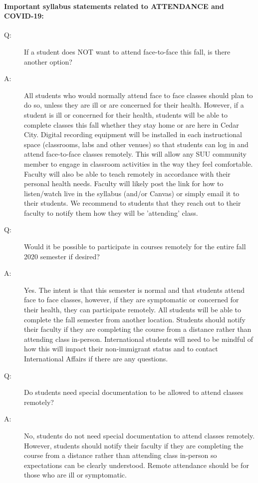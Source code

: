 \documentclass[12pt, letterpaper]{article}
\begin{document}
\paragraph{Important syllabus statements related to ATTENDANCE and COVID-19:}
\begin{description}
	\item[Q:~~~~~~] If a student does NOT want to attend face-to-face this fall, is there another option?
	\item[A:~~~~~~] All students who would normally attend face to face classes should plan to do so, unless they are ill or are concerned for their health. However, if a student is ill or concerned for their health, students will be able to complete classes this fall whether they stay home or are here in Cedar City. Digital recording equipment will be installed in each instructional space (classrooms, labs and other venues) so that students can log in and attend face-to-face classes remotely. This will allow any SUU community member to engage in classroom activities in the way they feel comfortable. Faculty will also be able to teach remotely in accordance with their personal health needs. Faculty will likely post the link for how to listen/watch live in the syllabus (and/or Canvas) or simply email it to their students. We recommend to students that they reach out to their faculty to notify them how they will be 'attending' class.
	\item[Q:~~~~~~] Would it be possible to participate in courses remotely for the entire fall 2020 semester if desired?
	\item[A:~~~~~~] Yes. The intent is that this semester is normal and that students attend face to face classes, however, if they are symptomatic or concerned for their health, they can participate remotely. All students will be able to complete the fall semester from another location. Students should notify their faculty if they are completing the course from a distance rather than attending class in-person. International students will need to be mindful of how this will impact their non-immigrant status and to contact International Affairs if there are any questions.
	\item[Q:~~~~~~] Do students need special documentation to be allowed to attend classes remotely?
	\item[A:~~~~~~]  No, students do not need special documentation to attend classes remotely. However, students should notify their faculty if they are completing the course from a distance rather than attending class in-person so expectations can be clearly understood. Remote attendance should be for those who are ill or symptomatic.
\end{description}
\end{document}
